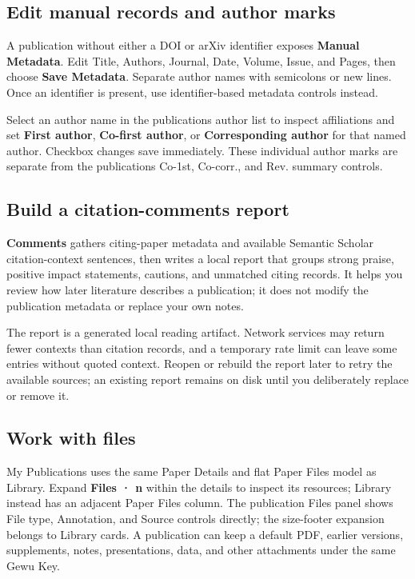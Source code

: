 \documentclass[10pt,letterpaper,oneside]{scrreprt}
\begin{document}
\subsection{Edit manual records and author marks}\label{edit-manual-records-and-author-marks}

A publication without either a DOI or arXiv identifier exposes \textbf{Manual Metadata}. Edit Title, Authors, Journal, Date, Volume, Issue, and Pages, then choose \textbf{Save Metadata}. Separate author names with semicolons or new lines. Once an identifier is present, use identifier-based metadata controls instead.

Select an author name in the publication\textquotesingle s author list to inspect affiliations and set \textbf{First author}, \textbf{Co-first author}, or \textbf{Corresponding author} for that named author. Checkbox changes save immediately. These individual author marks are separate from the publication\textquotesingle s Co-1st, Co-corr., and Rev. summary controls.

\subsection{Build a citation-comments report}\label{build-a-citation-comments-report}

\textbf{Comments} gathers citing-paper metadata and available Semantic Scholar citation-context sentences, then writes a local report that groups strong praise, positive impact statements, cautions, and unmatched citing records. It helps you review how later literature describes a publication; it does not modify the publication metadata or replace your own notes.

The report is a generated local reading artifact. Network services may return fewer contexts than citation records, and a temporary rate limit can leave some entries without quoted context. Reopen or rebuild the report later to retry the available sources; an existing report remains on disk until you deliberately replace or remove it.

\subsection{Work with files}\label{work-with-files}

My Publications uses the same Paper Details and flat Paper Files model as Library. Expand \textbf{Files · n} within the details to inspect its resources; Library instead has an adjacent Paper Files column. The publication Files panel shows File type, Annotation, and Source controls directly; the size-footer expansion belongs to Library cards. A publication can keep a default PDF, earlier versions, supplements, notes, presentations, data, and other attachments under the same Gewu Key.
\end{document}
